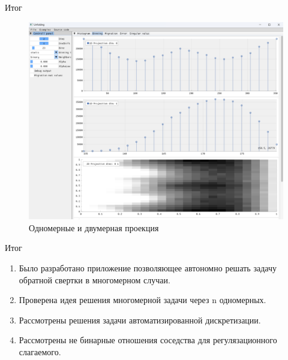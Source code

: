 \documentclass[fullscreen=true,russian,compress,%
	hyperref={unicode,bookmarks=false}]{presentation}
\begin{document}
\begin{frame}{Итог}
   \begin{figure}[h!]
      \centering
      \includegraphics[scale=0.3]{images/binning_projections_example.png}
      \caption{Одномерные и двумерная проекция}
   \end{figure}
\end{frame}

\begin{frame}{Итог}
   \begin{enumerate}
      \item Было разработано приложение позволяющее автономно решать задачу обратной свертки в многомерном случаи.
      \item Проверена идея решения многомерной задачи через n одномерных.
      \item Рассмотрены решения задачи автоматизированной дискретизации.
      \item Рассмотрены не бинарные отношения соседства для регулязационного слагаемого.
   \end{enumerate}
\end{frame}
\end{document}
